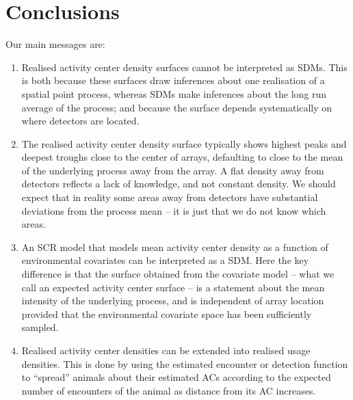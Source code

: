 \documentclass[10pt,a4paper]{article}
\begin{document}
\section{Conclusions}

Our main messages are:
\begin{enumerate}
\item Realised activity center density surfaces cannot be interpreted as SDMs. This is both because these surfaces draw inferences about one realisation of a spatial point process, whereas SDMs make inferences about the long run average of the process; and because the surface depends systematically on where detectors are located.
\item The realised activity center density surface typically shows highest peaks and deepest troughs close to the center of arrays, defaulting to close to the mean of the underlying process away from the array. A flat density away from detectors reflects a lack of knowledge, and not constant density. We should expect that in reality some areas away from detectors have substantial deviations from the process mean -- it is just that we do not know which areas.

\item An SCR model that models mean activity center density as a function of environmental covariates can be interpreted as a SDM. Here the key difference is that the surface obtained from the covariate model -- what we call an expected activity center surface -- is a statement about the mean intensity of the underlying process, and is independent of array location provided that the environmental covariate space has been sufficiently sampled.

\item Realised activity center densities can be extended into realised usage densities. This is done by using the estimated encounter or detection function to ``spread'' animals about their estimated ACs according to the expected number of encounters of the animal as distance from its AC increases. 
\end{enumerate}
\end{document}
